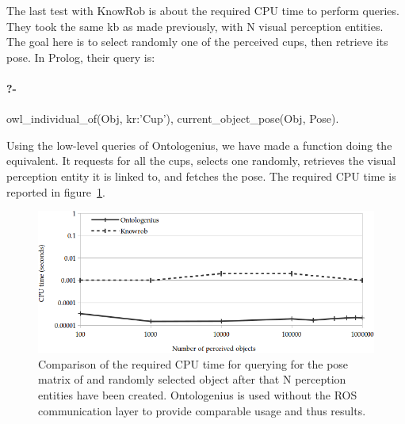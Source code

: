 The last test with KnowRob is about the required CPU time to perform queries. They took the same \acrshort{kb} as made previously, with N visual perception entities. The goal here is to select randomly one of the perceived cups, then retrieve its pose. In Prolog, their query is:

\paragraph{?-} owl\_individual\_of(Obj, kr:’Cup’), current\_object\_pose(Obj, Pose).

Using the low-level queries of Ontologenius, we have made a function doing the equivalent. It requests for all the cups, selects one randomly, retrieves the visual perception entity it is linked to, and fetches the pose. The required CPU time is reported in figure~\ref{fig:chap2_knowrob_query}.

\begin{figure}[ht!]
\centering
\includegraphics[width=\textwidth]{figures/chapter2/knowrob/Query.png}
\caption{\label{fig:chap2_knowrob_query} Comparison of the required CPU time for querying for the pose matrix of and randomly selected object after that N perception entities have been created. Ontologenius is used without the ROS communication layer to provide comparable usage and thus results.}
\end{figure}

